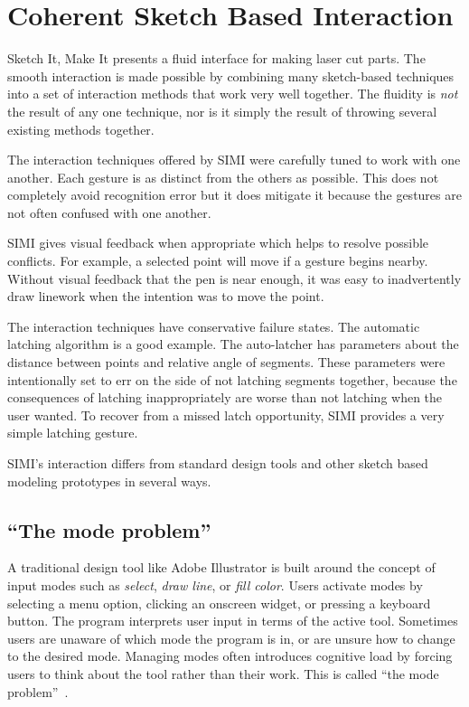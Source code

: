 \section{Coherent Sketch Based Interaction}

Sketch It, Make It presents a fluid interface for making laser cut
parts. The smooth interaction is made possible by combining many
sketch-based techniques into a set of interaction methods that work
very well together. The fluidity is \textit{not} the result of any one
technique, nor is it simply the result of throwing several existing
methods together.

The interaction techniques offered by SIMI were carefully tuned to
work with one another. Each gesture is as distinct from the others as
possible. This does not completely avoid recognition error but it does
mitigate it because the gestures are not often confused with one
another.

SIMI gives visual feedback when appropriate which helps to resolve
possible conflicts. For example, a selected point will move if a
gesture begins nearby. Without visual feedback that the pen is near
enough, it was easy to inadvertently draw linework when the intention
was to move the point.

The interaction techniques have conservative failure states. The
automatic latching algorithm is a good example. The auto-latcher has
parameters about the distance between points and relative angle of
segments. These parameters were intentionally set to err on the side
of not latching segments together, because the consequences of
latching inappropriately are worse than not latching when the user
wanted. To recover from a missed latch opportunity, SIMI provides a
very simple latching gesture.

SIMI's interaction differs from standard design tools and other sketch
based modeling prototypes in several ways.

\subsection{``The mode problem''}

A traditional design tool like Adobe Illustrator is built around the
concept of input modes such as \textit{select}, \textit{draw line}, or
\textit{fill color}. Users activate modes by selecting a menu option,
clicking an onscreen widget, or pressing a keyboard button. The
program interprets user input in terms of the active tool. Sometimes
users are unaware of which mode the program is in, or are unsure how
to change to the desired mode. Managing modes often introduces
cognitive load by forcing users to think about the tool rather than
their work. This is called ``the mode
problem''~\cite{tesler-mode-problem}.


